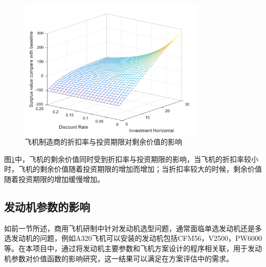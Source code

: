 \documentclass[12pt,a4paper]{report}
\begin{document}
\begin{figure}[H]
	\centering
	\includegraphics[width=0.8\textwidth]{./media512/discount.png}
	\caption{飞机制造商的折扣率与投资期限对剩余价值的影响}
	\label{fig:discount}
\end{figure}
图\ref{fig:discount}中，飞机的剩余价值同时受到折扣率与投资期限的影响，当飞机的折扣率较小时，飞机的剩余价值随着投资期限的增加而增加；当折扣率较大的时候，剩余价值随着投资期限的增加缓慢增加。

\subsection{发动机参数的影响}

如前一节所述，商用飞机研制中针对发动机选型问题，通常面临单选发动机还是多选发动机的问题，例如A320飞机可以安装的发动机包括CFM56，V2500，PW6000等。在本项目中，通过将发动机主要参数和飞机方案设计的程序相关联，用于发动机参数对价值函数的影响研究，这一结果可以满足在方案评估中的需求。
\end{document}

